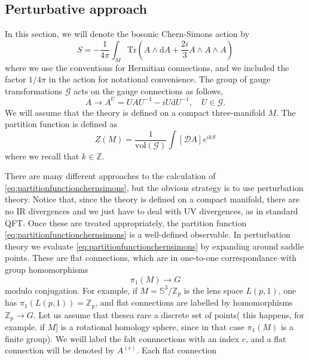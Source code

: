  \subsection{Perturbative approach}
 In this section, we will denote the bosonic Chern-Simons action by
 \begin{equation}
   S = - \frac{1}{4\pi}\int_M\mathrm{Tr}(A\wedge\mathrm{d}A
   + \frac{2i}{3}A\wedge A\wedge A)
 \end{equation}
 where we use the conventions for Hermitian connections, and we included the
 factor $1/4\pi$ in the action for notational convenience. The group of gauge
 transformations $\mathcal{G}$ acts on the gauge connections as
 follows,
 \begin{equation}
   A\rightarrow A^U = UAU^{-1} - iU\mathrm{d}U^{-1}, \quad U\in\mathcal{G}.
 \end{equation}
 We will assume that the theory is defined on a compact three-manifold $M$. The
 partition function is defined as 
 \begin{equation}
   Z(M)
   = \frac{1}{\mathrm{vol}(\mathcal{G})}\int\left[\mathcal{D}A\right]e^{ikS}
   \label{eq:partitionfunctionchernsimons}
 \end{equation}
 where we recall that $k\in\mathbb{Z}$.
 \par There are many different approaches to the calculation of
 \eqref{eq:partitionfunctionchernsimons}, but the obvious strategy is to use
 perturbation theory. Notice that, since the theory is defined on a compact
 manifold, there are no IR divergences and we just have to deal with UV
 divergences, as in standard QFT. Once these are treated appropriately, the
 partition function \eqref{eq:partitionfunctionchernsimons} is a well-defined
 observable. In perturbation theory we evaluate
 \eqref{eq:partitionfunctionchernsimons} by expanding around saddle points.
 These are flat connections, which are in one-to-one correspondance with group
 homomorphisms
 \begin{equation}
   \pi_1(M)\rightarrow G
 \end{equation}
 modulo conjugation. For example, if $M = \mathbb{S}^3/\mathbb{Z}_p$ is the
 lens space $L(p,1)$, one has $\pi_1(L(p,1))=\mathbb{Z}_p$, and flat
 connections are labelled by homomorphisms $\mathbb{Z}_p \rightarrow G$. Let us
 assume that thesea rare a discrete set of points( this happens, for example.
 if $M$] is a rotational homology sphere, since in that case $\pi_1(M)$ is
 a finite group). We weill label the falt connnections with an index $c$, and
 a flat connection will be denoted by $A^{(c)}$. Each flat connection
